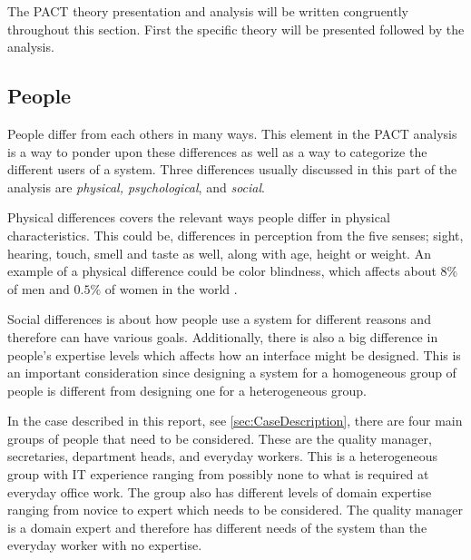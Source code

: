 The PACT theory presentation and analysis will be written congruently throughout this section. First the specific theory will be presented followed by the analysis.

\subsection{People}\label{PACT-people}
People differ from each others in many ways.
This element in the PACT analysis is a way to ponder upon these differences as well as a way to categorize the different users of a system.
Three differences usually discussed in this part of the analysis are \textit{physical, psychological}, and \textit{social}. \citep{Benyon}

Physical differences covers the relevant ways people differ in physical characteristics.
This could be, differences in perception from the five senses; sight, hearing, touch, smell and taste as well, along with age, height or weight.
An example of a physical difference could be color blindness, which affects about $8\%$ of men and $0.5\%$ of women in the world \cite{ColourBlind}.

Social differences is about how people use a system for different reasons and therefore can have various goals.
Additionally, there is also a big difference in people's expertise levels which affects how an interface might be designed.
This is an important consideration since designing a system for a homogeneous group of people is  different from designing one for a heterogeneous group. \citep{Benyon}

In the case described in this report, see \cref{sec:CaseDescription}, there are four main groups of people that need to be considered.
These are the quality manager, secretaries, department heads, and everyday workers.
This is a heterogeneous group with IT experience ranging from possibly none to what is required at everyday office work.
The group also has different levels of domain expertise ranging from novice to expert which needs to be considered.
The quality manager is a domain expert and therefore has different needs of the system than the everyday worker with no expertise.


